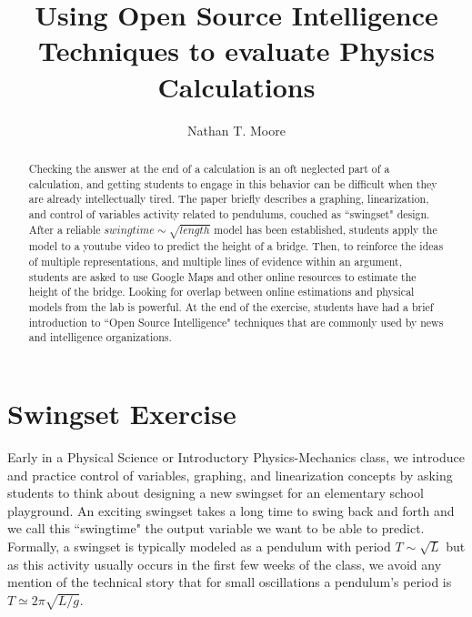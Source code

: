 \documentclass[12pt]{iopart}
\begin{document}
\title[Using Open Source Intelligence Techniques to evaluate Physics Calculations]{Using Open Source Intelligence Techniques to evaluate Physics Calculations}

\author{Nathan T. Moore}

\address{
	Physics and General Engineering, 
	Winona State University,
	Winona, MN 55987 USA
}
\vspace{10pt}
\begin{indented}
\item[\today]
\end{indented}

\begin{abstract}
Checking the answer at the end of a calculation is an oft neglected part of a calculation, and getting students to engage in this behavior can be difficult when they are already intellectually tired. 
	The paper briefly describes a graphing, linearization, and control of variables activity related to pendulums, couched as ``swingset" design. 
	After a reliable $swingtime \sim \sqrt{length}$ model has been established, students apply the model to a youtube video to predict the height of a bridge. 
	Then, to reinforce the ideas of multiple representations, and multiple lines of evidence within an argument, students are asked to use Google Maps and other online resources to estimate the height of the bridge. 
	Looking for overlap between online estimations and physical models from the lab is powerful. 
	At the end of the exercise, students have had a brief introduction to ``Open Source Intelligence" techniques that are commonly used by news and intelligence organizations. 
\end{abstract}

%
%
%
% 
%



\section{Swingset Exercise}
Early in a Physical Science or Introductory Physics-Mechanics class, we introduce and practice control of variables, graphing, and linearization concepts by asking students to think about designing a new swingset for an elementary school playground.  
An exciting swingset takes a long time to swing back and forth and we call this ``swingtime" the output variable we want to be able to predict.
Formally, a swingset is typically modeled as a pendulum with period 
$T \sim \sqrt{L}$ \cite{openstax_pendulum} but as this activity usually occurs in the first few weeks of the class, we avoid any mention of the technical story that for small oscillations a pendulum's period is $T\simeq 2\pi \sqrt{L/g}$.
\end{document}
